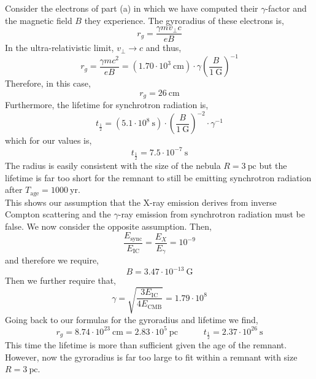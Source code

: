 \documentclass[12pt]{article}
\begin{document}
Consider the electrons of part (a) in which we have computed their $\gamma$-factor and the magnetic field $B$ they experience. The gyroradius of these electrons is,
\[ r_g = \frac{\gamma m v_\perp c}{e B} \]
In the ultra-relativistic limit, $v_\perp \to c$ and thus,
\[ r_g = \frac{\gamma m c^2}{e B} = (1.70 \cdot 10^3 \: \mathrm{cm}) \cdot \gamma \left( \frac{B}{1 \: \mathrm{G}} \right)^{-1} \]
Therefore, in this case,
\[ r_g = 26 \: \mathrm{cm} \]
Furthermore, the lifetime for synchrotron radiation is,
\[ t_{\frac{1}{2}} = (5.1 \cdot 10^8 \: \mathrm{s}) \cdot \left( \frac{B}{1 \: \mathrm{G}} \right)^{-2} \cdot \gamma^{-1} \]  
which for our values is,
\[ t_{\frac{1}{2}} = 7.5 \cdot 10^{-7} \: \mathrm{s}  \]
The radius is easily consistent with the size of the nebula $R = 3 \: \mathrm{pc}$ but the lifetime is far too short for the remnant to still be emitting synchrotron radiation after $T_{\text{age}} = 1000 \: \mathrm{yr}$. 
\bigskip\\
This shows our assumption that the X-ray emission derives from inverse Compton scattering and the $\gamma$-ray emission from synchrotron radiation must be false. We now consider the opposite assumption. Then,
\[ \frac{E_{\text{sync}}}{E_{\text{IC}}} = \frac{E_X}{E_{\gamma}} = 10^{-9} \]
and therefore we require,
\[ B = 3.47 \cdot 10^{-13} \: \mathrm{G} \]
Then we further require that,
\[ \gamma = \sqrt{\frac{3 E_{\mathrm{IC}}}{4 E_{\mathrm{CMB}}}} = 1.79 \cdot 10^8 \]
Going back to our formulas for the gyroradius and lifetime we find,
\[ r_g = 8.74 \cdot 10^{23} \: \mathrm{cm} = 2.83 \cdot 10^{5} \: \mathrm{pc} \quad \quad \quad t_{\frac{1}{2}} = 2.37 \cdot 10^{26} \: \mathrm{s} \]
This time the lifetime is more than sufficient given the age of the remnant. However, now the gyroradius is far too large to fit within a remnant with size $R = 3 \: \mathrm{pc}$. 
\end{document}
